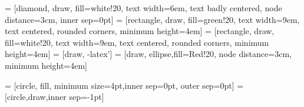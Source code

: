 \documentclass{article}
\begin{document}
\pagestyle{empty}


 = [diamond, draw, fill=white!20, 
text width=6em, text badly centered, node distance=3cm, inner sep=0pt]
 = [rectangle, draw, fill=green!20, 
text width=9em, text centered, rounded corners, minimum height=4em]
 = [rectangle, draw, fill=white!20, 
text width=9em, text centered, rounded corners, minimum height=4em]
 = [draw, -latex']
 = [draw, ellipse,fill=Red!20, node distance=3cm,
minimum height=4em]


\usetikzlibrary{arrows}
\pagestyle{empty}

= [circle, fill, minimum size=4pt,inner sep=0pt, outer sep=0pt]
 = [circle,draw,inner sep=-1pt]
\end{document}
